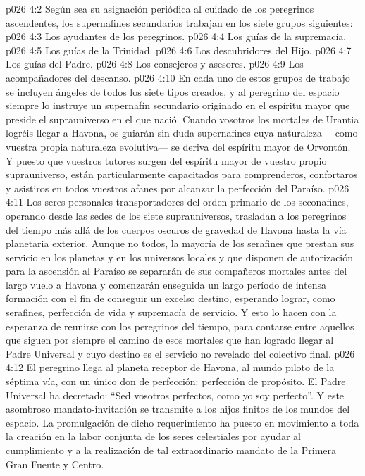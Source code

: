 \vs p026 4:2 \pc Según sea su asignación periódica al cuidado de los peregrinos ascendentes, los supernafines secundarios trabajan en los siete grupos siguientes:
\vs p026 4:3 Los ayudantes de los peregrinos.
\vs p026 4:4 Los guías de la supremacía.
\vs p026 4:5 Los guías de la Trinidad.
\vs p026 4:6 Los descubridores del Hijo.
\vs p026 4:7 Los guías del Padre.
\vs p026 4:8 Los consejeros y asesores.
\vs p026 4:9 Los acompañadores del descanso.
\vs p026 4:10 \pc En cada uno de estos grupos de trabajo se incluyen ángeles de todos los siete tipos creados, y al peregrino del espacio siempre lo instruye un supernafín secundario originado en el espíritu mayor que preside el suprauniverso en el que nació. Cuando vosotros los mortales de Urantia logréis llegar a Havona, os guiarán sin duda supernafines cuya naturaleza ---como vuestra propia naturaleza evolutiva--- se deriva del espíritu mayor de Orvontón. Y puesto que vuestros tutores surgen del espíritu mayor de vuestro propio suprauniverso, están particularmente capacitados para comprenderos, confortaros y asistiros en todos vuestros afanes por alcanzar la perfección del Paraíso.
\vs p026 4:11 Los seres personales transportadores del orden primario de los seconafines, operando desde las sedes de los siete suprauniversos, trasladan a los peregrinos del tiempo más allá de los cuerpos oscuros de gravedad de Havona hasta la vía planetaria exterior. Aunque no todos, la mayoría de los serafines que prestan sus servicio en los planetas y en los universos locales y que disponen de autorización para la ascensión al Paraíso se separarán de sus compañeros mortales antes del largo vuelo a Havona y comenzarán enseguida un largo período de intensa formación con el fin de conseguir un excelso destino, esperando lograr, como serafines, perfección de vida y supremacía de servicio. Y esto lo hacen con la esperanza de reunirse con los peregrinos del tiempo, para contarse entre aquellos que siguen por siempre el camino de esos mortales que han logrado llegar al Padre Universal y cuyo destino es el servicio no revelado del colectivo final.
\vs p026 4:12 El peregrino llega al planeta receptor de Havona, al mundo piloto de la séptima vía, con un único don de perfección: perfección de propósito. El Padre Universal ha decretado: “Sed vosotros perfectos, como yo soy perfecto”. Y este asombroso mandato\hyp{}invitación se transmite a los hijos finitos de los mundos del espacio. La promulgación de dicho requerimiento ha puesto en movimiento a toda la creación en la labor conjunta de los seres celestiales por ayudar al cumplimiento y a la realización de tal extraordinario mandato de la Primera Gran Fuente y Centro.
